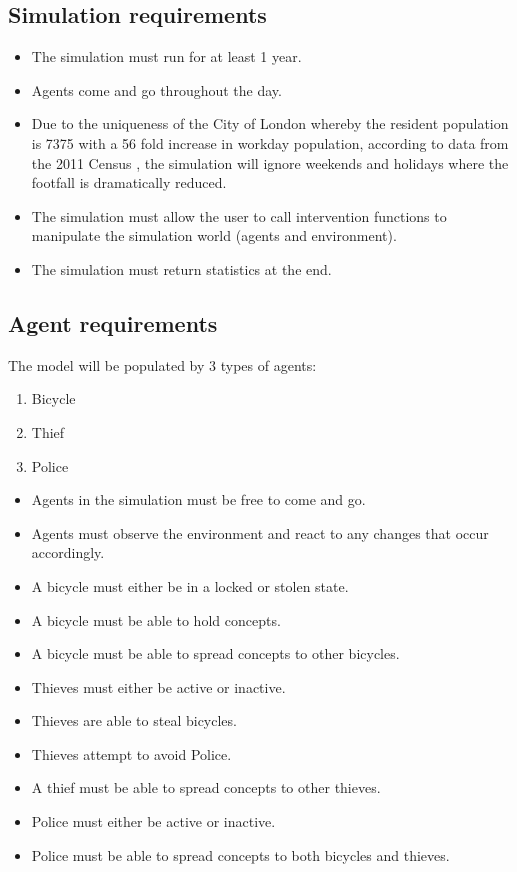 \documentclass[11pt]{informatics-report}
\begin{document}
\subsection{Simulation requirements}
\begin{itemize}
	\item The simulation must run for at least 1 year.
	\item Agents come and go throughout the day.
	\item Due to the uniqueness of the City of London whereby the resident population is 7375 with a 56 fold increase in workday population, according to data from the 2011 Census \cite{ons2011}, the simulation will ignore weekends and holidays where the footfall is dramatically reduced.
	\item The simulation must allow the user to call intervention functions to manipulate the simulation world (agents and environment).
	\item The simulation must return statistics at the end.
\end{itemize}
\subsection{Agent requirements}
The model will be populated by 3 types of agents:
\begin{enumerate}
\item Bicycle
\item Thief
\item Police 
\end{enumerate}

\begin{itemize}
\item Agents in the simulation must be free to come and go.
\item Agents must observe the environment and react to any changes that occur accordingly.
\item A bicycle must either be in a locked or stolen state.
\item A bicycle must be able to hold concepts.
\item A bicycle must be able to spread concepts to other bicycles.
\item Thieves must either be active or inactive.
\item Thieves are able to steal bicycles.
\item Thieves attempt to avoid Police.
\item A thief must be able to spread concepts to other thieves.
\item Police must either be active or inactive.
\item Police must be able to spread concepts to both bicycles and thieves.
\end{itemize}
\end{document}
